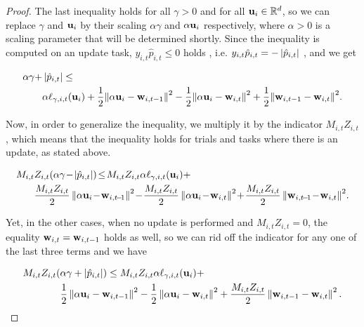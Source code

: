 {\begin{proof}
The last inequality holds for all $\gamma>0$ and for all
$\mathbf{u}_i\in\mathbb{R}^d$, so we can replace $\gamma$ and $\mathbf{u}_i$ by their
scaling $\alpha\gamma$ and $\alpha \mathbf{u}_i$ respectively, where $\alpha>0$
is a scaling parameter that will be determined shortly. Since the inequality is computed on an update task,
$y_{i,t}\hat{p}_{i,t}\le0$ holds , i.e. $y_{i,t}\hat{p}_{i,t}=-\left\vert{\hat{p}_{i,t}}\right\vert$ , and we get

\begin{equation*}
\begin{split}
\alpha\gamma  +&\left\vert{\hat{p}_{i,t}}\right\vert \le\\
&\alpha\ell_{\gamma,i,t}(\mathbf{u}_i)+\frac{1}{2}{\left\Vert {\alpha \mathbf{u}_i-\mathbf{w}_{i,t-1}} \right\Vert^2}-\frac{1}{2}{\left\Vert {\alpha \mathbf{u}_i-\mathbf{w}_{i,t}} \right\Vert^2}+\frac{1}{2}{\left\Vert {\mathbf{w}_{i,t-1}-\mathbf{w}_{i,t}} \right\Vert^2} .\end{split}
\end{equation*}

Now, in order to generalize the inequality, we multiply it by the indicator $M_{i,t}Z_{i,t}$ , 
which means that the inequality holds for  trials and tasks where there is an update, as stated above.

\begin{equation*}
\begin{split}
M_{i,t}&Z_{i,t}{\paren{\alpha\gamma \!-\!\abs{\hat{p}_{i,t}}}} \!\le\! M_{i,t}Z_{i,t}\alpha \lossp{\gamma,i,t}(\vu_i)
+\\ &\frac{M_{i,t}Z_{i,t}}{2}\normt{\alpha \vu_i\!-\!\vwi{i,t\!-\!1}}\!-\!\frac{M_{i,t}Z_{i,t}}{2}\normt{\alpha \vu_i\!-\!\vwiit}\!+\!
\frac{M_{i,t}Z_{i,t}}{2}\normt{\vwi{i,t\!-\!1}\!-\!\vwiit}\!.
\end{split}
\end{equation*} 

 Yet, in the other cases,  when no update is performed and  $M_{i,t}Z_{i,t}=0$,
the equality $\mathbf{w}_{i,t}=\mathbf{w}_{i,t-1}$ holds as well, so we can rid off the indicator for any one of the last three 
terms and we have

\begin{equation}
\begin{split}
M_{i,t}Z_{i,t}{\left({\alpha\gamma +\left\vert{\hat{p}_{i,t}}\right\vert}\right)} \le M_{i,t}&Z_{i,t}\alpha \ell_{\gamma,i,t}(\mathbf{u}_i)+\\ 
\frac{1}{2}\left\Vert {\alpha \mathbf{u}_i-\mathbf{w}_{i,t-1}} \right\Vert^2&-\frac{1}{2}\left\Vert {\alpha \mathbf{u}_i-\mathbf{w}_{i,t}} \right\Vert^2+
\frac{M_{i,t}Z_{i,t}}{2}\left\Vert {\mathbf{w}_{i,t-1}-\mathbf{w}_{i,t}} \right\Vert^2.
\end{split}
\end{equation}\label{step_1_in_proof} 


\end{proof}}
